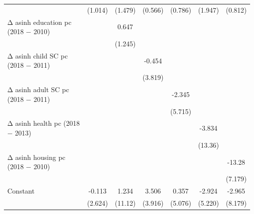 \begin{table}[htbp]
\begin{tabular}{l*{6}{c}}
                    &     (1.014)         &     (1.479)         &     (0.566)         &     (0.786)         &     (1.947)         &     (0.812)         \\
\addlinespace
Δ asinh education pc (2018 − 2010)&                     &       0.647         &                     &                     &                     &                     \\
                    &                     &     (1.245)         &                     &                     &                     &                     \\
\addlinespace
Δ asinh child SC pc (2018 − 2011)&                     &                     &      -0.454         &                     &                     &                     \\
                    &                     &                     &     (3.819)         &                     &                     &                     \\
\addlinespace
Δ asinh adult SC pc (2018 − 2011)&                     &                     &                     &      -2.345         &                     &                     \\
                    &                     &                     &                     &     (5.715)         &                     &                     \\
\addlinespace
Δ asinh health pc (2018 − 2013)&                     &                     &                     &                     &      -3.834         &                     \\
                    &                     &                     &                     &                     &     (13.36)         &                     \\
\addlinespace
Δ asinh housing pc (2018 − 2010)&                     &                     &                     &                     &                     &      -13.28\sym{*}  \\
                    &                     &                     &                     &                     &                     &     (7.179)         \\
\addlinespace
Constant            &      -0.113         &       1.234         &       3.506         &       0.357         &      -2.924         &      -2.965         \\
                    &     (2.624)         &     (11.12)         &     (3.916)         &     (5.076)         &     (5.220)         &     (8.179)         \\

\end{tabular}
\end{table}

